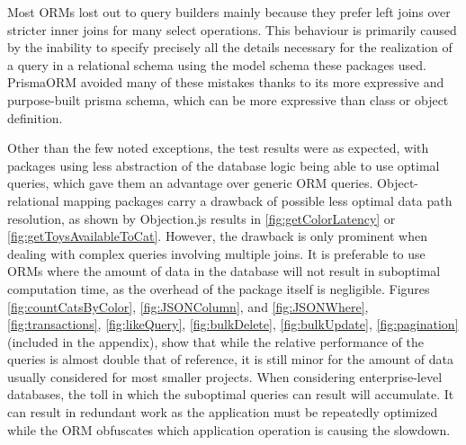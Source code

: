Most ORMs lost out to query builders mainly because they prefer left joins over
stricter inner joins for many select operations. This behaviour is primarily
caused by the inability to specify precisely all the details necessary for the
realization of a query in a relational schema using the model schema these
packages used. PrismaORM avoided many of these mistakes thanks to its more
expressive and purpose-built prisma schema, which can be more expressive than
class or object definition.

Other than the few noted exceptions, the test results were as expected, with
packages using less abstraction of the database logic being able to use optimal
queries, which gave them an advantage over generic ORM queries.
Object-relational mapping packages carry a drawback of possible less optimal
data path resolution, as shown by Objection.js results in
\autoref{fig:getColorLatency} or \autoref{fig:getToysAvailableToCat}. However,
the drawback is only prominent when dealing with complex queries involving
multiple joins. It is preferable to use ORMs where the amount of data in the
database will not result in suboptimal computation time, as the overhead of the
package itself is negligible. Figures \ref{fig:countCatsByColor},
\ref{fig:JSONColumn}, and \ref{fig:JSONWhere}, \ref{fig:transactions},
\ref{fig:likeQuery}, \ref{fig:bulkDelete}, \ref{fig:bulkUpdate},
\ref{fig:pagination} (included in the appendix), show that while the relative
performance of the queries is almost double that of reference, it is still minor
for the amount of data usually considered for most smaller projects. When
considering enterprise-level databases, the toll in which the suboptimal queries
can result will accumulate. It can result in redundant work as the application
must be repeatedly optimized while the ORM obfuscates which application
operation is causing the slowdown. 
